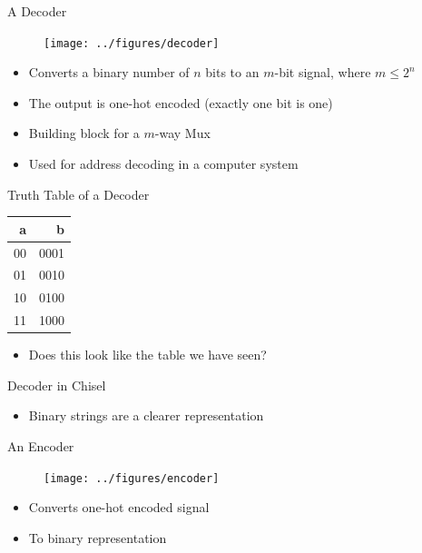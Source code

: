\begin{frame}[fragile]{A Decoder}
\begin{figure}
  \texttt{[image: ../figures/decoder]}
\end{figure}
\begin{itemize}
\item Converts a binary number of $n$ bits to an $m$-bit signal, where $m \leq 2^n$
\item The output is one-hot encoded (exactly one bit is one)
\item Building block for a $m$-way Mux
\item Used for address decoding in a computer system
\end{itemize}
\end{frame}

\begin{frame}[fragile]{Truth Table of a Decoder}
\begin{table}
  \begin{tabular}{rr}
    \toprule
    a & b \\
    \midrule
    00 & 0001 \\
    01 & 0010 \\
    10 & 0100 \\
    11 & 1000 \\
    \bottomrule 
  \end{tabular} 
\end{table}
\begin{itemize}
\item Does this look like the table we have seen?
\end{itemize}
\end{frame}

\begin{frame}[fragile]{Decoder in Chisel}
\begin{itemize}
\item Binary strings are a clearer representation
\end{itemize}
\end{frame}

\begin{frame}[fragile]{An Encoder}
\begin{figure}
  \texttt{[image: ../figures/encoder]}
\end{figure}
\begin{itemize}
\item Converts one-hot encoded signal
\item To binary representation
\end{itemize}
\end{frame}

